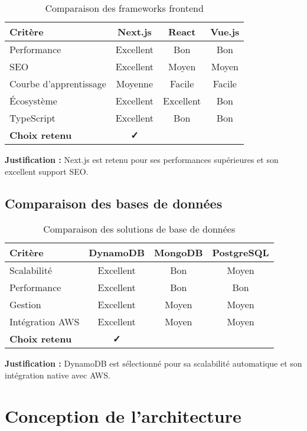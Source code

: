 \begin{table}[H]
\centering
\caption{Comparaison des frameworks frontend}
\begin{tabular}{|l|c|c|c|}
\hline
\textbf{Critère} & \textbf{Next.js} & \textbf{React} & \textbf{Vue.js} \\
\hline
Performance & Excellent & Bon & Bon \\
\hline
SEO & Excellent & Moyen & Moyen \\
\hline
Courbe d'apprentissage & Moyenne & Facile & Facile \\
\hline
Écosystème & Excellent & Excellent & Bon \\
\hline
TypeScript & Excellent & Bon & Bon \\
\hline
\textbf{Choix retenu} & \textbf{✓} & & \\
\hline
\end{tabular}
\end{table}

\textbf{Justification :} Next.js est retenu pour ses performances supérieures et son excellent support SEO.

\subsection{Comparaison des bases de données}

\begin{table}[H]
\centering
\caption{Comparaison des solutions de base de données}
\begin{tabular}{|l|c|c|c|}
\hline
\textbf{Critère} & \textbf{DynamoDB} & \textbf{MongoDB} & \textbf{PostgreSQL} \\
\hline
Scalabilité & Excellent & Bon & Moyen \\
\hline
Performance & Excellent & Bon & Bon \\
\hline
Gestion & Excellent & Moyen & Moyen \\
\hline
Intégration AWS & Excellent & Moyen & Moyen \\
\hline
\textbf{Choix retenu} & \textbf{✓} & & \\
\hline
\end{tabular}
\end{table}

\textbf{Justification :} DynamoDB est sélectionné pour sa scalabilité automatique et son intégration native avec AWS.

\section{Conception de l'architecture}

